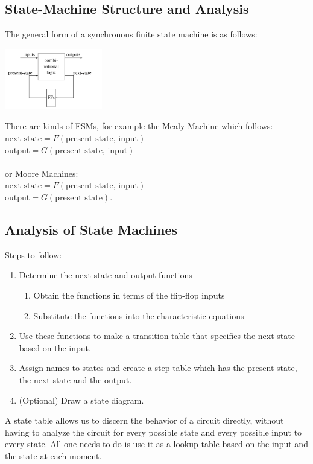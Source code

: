 \documentclass[nobib]{tufte-handout}
\begin{document}
    \subsection{State-Machine Structure and Analysis}
    The general form of a synchronous finite state machine is as follows:
    \begin{center}
        \includegraphics[height = 100px]{images/fsm_basic.png}
    \end{center}
    There are kinds of FSMs, for example the Mealy Machine which follows:\\
$\text{next state} = F(\text{present state, input})$\\
$\text{output} = G(\text{present state, input})$\\~\\
    or Moore Machines:\\
$\text{next state} = F(\text{present state, input})$\\
$\text{output} = G(\text{present state})$.\\
\subsection{Analysis of State Machines}
Steps to follow:
\begin{enumerate}
    \item Determine the next-state and output functions
          \begin{enumerate}
              \item Obtain the functions in terms of the flip-flop inputs
              \item Substitute the functions into the characteristic equations
          \end{enumerate}
    \item Use these functions to make a transition table that specifies the next state
          based on the input.
    \item Assign names to states and create a step table which has the present state, the
          next state and the output.
    \item (Optional) Draw a state diagram.
\end{enumerate}
A state table allows us to discern the behavior of a circuit directly, without having to analyze the circuit for every possible state and every possible input to every state. All one needs to do is use it as a lookup table based on the input and the state at each moment.\\
\end{document}
